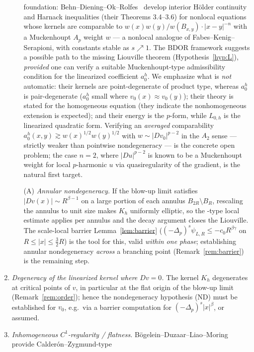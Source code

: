 \documentclass[11pt]{amsart}
\theoremstyle{plain}
\theoremstyle{definition}
\theoremstyle{remark}
\newcommand{\fpl}[1]{(-\Delta_p)^{s}#1}
\begin{document}
\begin{enumerate}[leftmargin=2em]
\begin{itemize}[leftmargin=2.2em]
  foundation: Behn--Diening--Ok--Rolfes~\cite{BDOR} develop interior H\"older
  continuity and Harnack inequalities (their Theorems 3.4--3.6) for nonlocal
  equations whose kernels are comparable to
  $w(x)w(y)/w(B_{x,y})\cdot|x-y|^{-n}$ with a Muckenhoupt $A_p$ weight $w$ ---
  a nonlocal analogue of Fabes--Kenig--Serapioni, with constants stable as
  $s\nearrow1$. The BDOR framework suggests a possible path to the missing
  Liouville theorem (Hypothesis~\ref{hyp:L}), \emph{provided} one can verify a
  suitable Muckenhoupt-type admissibility condition for the linearized
  coefficient $a_0^h$. We emphasize what is \emph{not} automatic: their
  kernels are point-degenerate of product type, whereas $a_0^h$ is
  pair-degenerate ($a_0^h$ small where $v_0(x)\approx v_0(y)$); their theory
  is stated for the homogeneous equation (they indicate the nonhomogeneous
  extension is expected); and their energy is the $p$-form, while $L_{0,h}$ is
  the linearized quadratic form. Verifying an \emph{averaged} comparability
  $a_0^h(x,y)\gtrsim w(x)^{1/2}w(y)^{1/2}$ with $w\sim|Dv_0|^{p-2}$ in the
  $A_2$ sense --- strictly weaker than pointwise nondegeneracy --- is the
  concrete open problem; the case $n=2$, where $|Du|^{p-2}$ is known to be a
  Muckenhoupt weight for local $p$-harmonic $u$ via quasiregularity of the
  gradient, is the natural first target.
\item[(A)] \emph{Annular nondegeneracy.} If the blow-up limit satisfies
  $|Dv(x)|\sim R^{\beta-1}$ on a large portion of each annulus
  $B_{2R}\setminus B_R$, rescaling the annulus to unit size makes $K_h$
  uniformly elliptic, so the \cite{GJS}-type local estimate applies per annulus
  and the decay argument closes the Liouville. The scale-local barrier
  Lemma~\ref{lem:barrier} ($\fpl{\psi_{L,R}}\le-c_0R^{\beta\gamma}$ on
  $R\le|x|\le\frac32R$) is the tool for this, valid \emph{within one phase};
  establishing annular nondegeneracy \emph{across} a branching point
  (Remark~\ref{rem:barrier}) is the remaining step.
\end{itemize}
\item \emph{Degeneracy of the linearized kernel where $Dv=0$.} The kernel
$K_h$ degenerates at critical points of $v$, in particular at the flat origin
of the blow-up limit (Remark~\ref{rem:order}); hence the nondegeneracy
hypothesis \textnormal{(ND)} must be established for $v_0$, e.g.\ via a barrier
computation for $\fpl{|x|^{\beta}}$, or assumed.
\item \emph{Inhomogeneous $C^1$-regularity / flatness.}
B\"ogelein--Duzaar--Liao--Moring~\cite{BDLM} provide Calder\'on--Zygmund-type

\end{enumerate}
\end{document}
